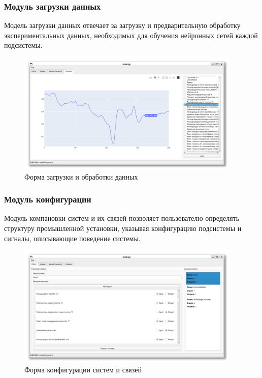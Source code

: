 \subsubsection{Модуль загрузки данных}

Модель загрузки данных отвечает за загрузку и предварительную обработку
экспериментальных данных, необходимых для обучения нейронных сетей каждой
подсистемы. 

\begin{figure}[H]
  \begin{center}
    \includegraphics[width=0.95\textwidth]{figures/modules/loader.png}
  \end{center}
  \caption{Форма загрузки и обработки данных}\label{fig:forms:loader}
\end{figure}

\subsubsection{Модуль конфигурации}

Модуль компановки систем и их связей позволяет пользователю определять
структуру промышленной установки, указывая конфигурацию подсистемы и сигналы,
описывающие поведение системы. 

\begin{figure}[H]
  \begin{center}
    \includegraphics[width=0.95\textwidth]{figures/modules/editor.png}
  \end{center}
  \caption{Форма конфигурации систем и связей}\label{fig:forms:editor}
\end{figure}

